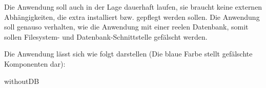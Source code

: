 Die Anwendung soll auch in der Lage dauerhaft laufen, 
sie braucht keine externen Abhängigkeiten, die extra installiert bzw. gepflegt werden sollen.
Die Anwendung soll genauso verhalten, wie die Anwendung mit einer reelen Datenbank, 
somit sollen Filesystem- und Datenbank-Schnittstelle gefälscht werden.

Die Anwendung lässt sich wie folgt darstellen (Die blaue Farbe stellt gefälschte Komponenten dar):

{withoutDB}